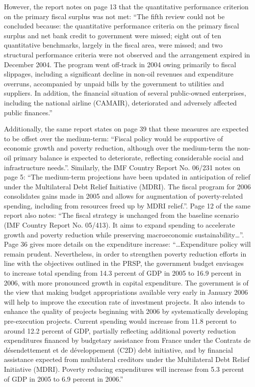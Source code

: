 However, the report notes on page 13 that the quantitative performance criterion on the primary fiscal surplus was not met: “The fifth review could not be concluded because: the quantitative performance criteria on the primary fiscal surplus and net bank credit to government were missed; eight out of ten quantitative benchmarks, largely in the fiscal area, were missed; and two structural performance criteria were not observed and the arrangement expired in December 2004. The program went off-track in 2004 owing primarily to fiscal slippages, including a significant decline in non-oil revenues and expenditure overruns, accompanied by unpaid bills by the government to utilities and suppliers. In addition, the financial situation of several public-owned enterprises, including the national airline (CAMAIR), deteriorated and adversely affected public finances.”

Additionally, the same report states on page 39 that these measures are expected to be offset over the medium-term: “Fiscal policy would be supportive of economic growth and poverty reduction, although over the medium-term the non-oil primary balance is expected to deteriorate, reflecting considerable social and infrastructure needs.”. Similarly, the IMF Country Report No. 06/231 notes on page 5: “The medium-term projections have been updated in anticipation of relief under the Multilateral Debt Relief Initiative (MDRI). The fiscal program for 2006 consolidates gains made in 2005 and allows for augmentation of poverty-related spending, including from resources freed up by MDRI relief.”. Page 12 of the same report also notes: “The fiscal strategy is unchanged from the baseline scenario (IMF Country Report No. 05/413). It aims to expand spending to accelerate growth and poverty reduction while preserving macroeconomic sustainability…”. Page 36 gives more details on the expenditure increase: “…Expenditure policy will remain prudent. Nevertheless, in order to strengthen poverty reduction efforts in line with the objectives outlined in the PRSP, the government budget envisages to increase total spending from 14.3 percent of GDP in 2005 to 16.9 percent in 2006, with more pronounced growth in capital expenditure. The government is of the view that making budget appropriations available very early in January 2006 will help to improve the execution rate of investment projects. It also intends to enhance the quality of projects beginning with 2006 by systematically developing pre-execution projects. Current spending would increase from 11.8 percent to around 12.2 percent of GDP, partially reflecting additional poverty reduction expenditures financed by budgetary assistance from France under the Contrats de désendettement et de développement (C2D) debt initiative, and by financial assistance expected from multilateral creditors under the Multilateral Debt Relief Initiative (MDRI). Poverty reducing expenditures will increase from 5.3 percent of GDP in 2005 to 6.9 percent in 2006.”

